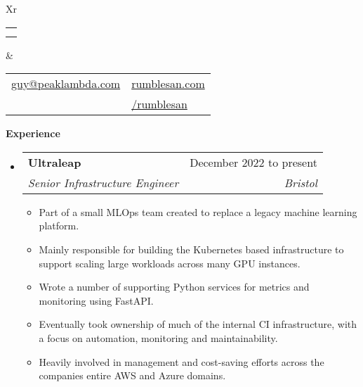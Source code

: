 \documentclass[letterpaper,12pt]{article}[leftmargin=*]
\makeatletter
\def \fullname {David Guy John}
\def \subtitle {}
\def \phoneicon {\faPhone}
\def \phonetext {07531 668 965}
\def \emailicon {\faEnvelope}
\def \emaillink {mailto:guy@peaklambda.com}
\def \emailtext {guy@peaklambda.com}
\def \githubicon {\faGithub}
\def \githublink {https://github.com/rumblesan}
\def \githubtext {/rumblesan}
\def \websiteicon {\faGlobe}
\def \websitelink {https://rumblesan.com/}
\def \websitetext {rumblesan.com}
\def \entryspacing {-0pt}
\def \phone {\phoneicon \hspace{3pt}{ \phonetext}}
\def \email {\emailicon \hspace{3pt}\href{\emaillink}{\emailtext}}
\def \github {\githubicon \hspace{3pt}\href{\githublink}{\githubtext}}
\def \website {\websiteicon \hspace{3pt}\href{\websitelink}{\websitetext}}
\renewcommand{\section}[2]{\vspace{5pt}
  \colorbox{secondary}{\color{white}\raggedbottom\normalsize{#1}{\hspace{7pt}\textbf{#2}}}
}
\newenvironment{resumeEntry}[0]{
  \begin{itemize}[leftmargin=2.5mm]
  }{
  \end{itemize}\vspace{\entryspacing}
}
\newenvironment{resumeItemList}[0]{
  \begin{itemize}[leftmargin=4.5mm]
  }{
  \end{itemize}
}
\newcommand{\resumeItem}[1]{
  \item\small{
    {#1 \vspace{-2pt}}
  }
}
\newcommand{\resumeEntryTSDL}[4]{
  \vspace{-1pt}\item[]
    \begin{tabularx}{0.97\textwidth}{X@{\hspace{60pt}}r}
      \textbf{\color{primary}#1} & {\firabook\color{accent}\small#2} \\
      \textit{\color{accent}\small#3} & \textit{\color{accent}\small#4} \\
    \end{tabularx}\vspace{-6pt}
}
\newcommand{\cvHeader}[4]{
  \begin{tabularx}{\textwidth}{Xr}
    {
      \begin{tabular}{l}
        \fontsize{35}{45}\selectfont{\color{primary}{{\textbf{\fullname}}}} \\
        {\textit{\subtitle}}
      \end{tabular}
    } & {
      \begin{tabular}{l@{\hspace{1.5em}}l}
        {\small#1} & {\small#3} \\
        {\small#2} & {\small#4}
      \end{tabular}
    }
  \end{tabularx}
}
\makeatother
\begin{document}


\cvHeader{\email}{\phone}{\website}{\github} %
\vspace{-10pt} %




\section{\faPieChart}{Experience}

  \begin{resumeEntry}
    \resumeEntryTSDL{Ultraleap}{December 2022 to present}
      {Senior Infrastructure Engineer}{Bristol}
    \begin{resumeItemList}
      \resumeItem{Part of a small MLOps team created to replace a legacy machine learning platform.}
      \resumeItem{Mainly responsible for building the Kubernetes based infrastructure to support scaling large workloads across many GPU instances.}
      \resumeItem{Wrote a number of supporting Python services for metrics and monitoring using FastAPI.}
      \resumeItem{Eventually took ownership of much of the internal CI infrastructure, with a focus on automation, monitoring and maintainability.}
      \resumeItem{Heavily involved in management and cost-saving efforts across the companies entire AWS and Azure domains.}
    \end{resumeItemList}
  \end{resumeEntry}
\end{document}
